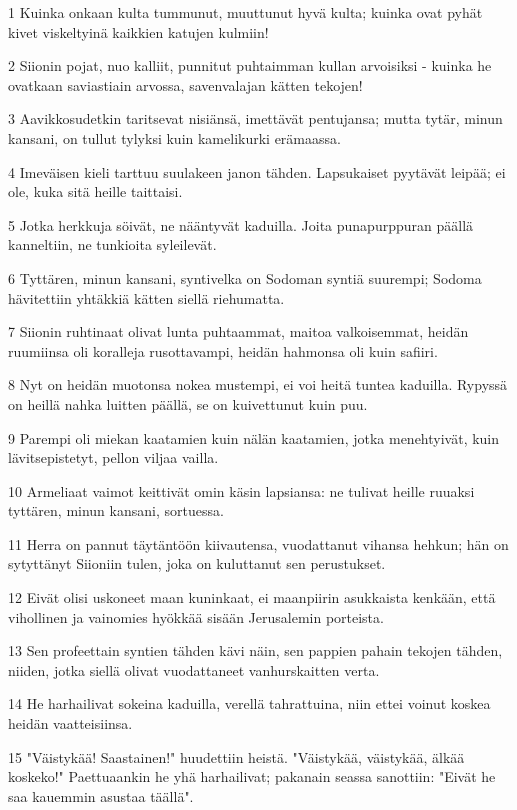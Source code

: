 \par 1 Kuinka onkaan kulta tummunut, muuttunut hyvä kulta; kuinka ovat pyhät kivet viskeltyinä kaikkien katujen kulmiin!
\par 2 Siionin pojat, nuo kalliit, punnitut puhtaimman kullan arvoisiksi - kuinka he ovatkaan saviastiain arvossa, savenvalajan kätten tekojen!
\par 3 Aavikkosudetkin taritsevat nisiänsä, imettävät pentujansa; mutta tytär, minun kansani, on tullut tylyksi kuin kamelikurki erämaassa.
\par 4 Imeväisen kieli tarttuu suulakeen janon tähden. Lapsukaiset pyytävät leipää; ei ole, kuka sitä heille taittaisi.
\par 5 Jotka herkkuja söivät, ne nääntyvät kaduilla. Joita punapurppuran päällä kanneltiin, ne tunkioita syleilevät.
\par 6 Tyttären, minun kansani, syntivelka on Sodoman syntiä suurempi; Sodoma hävitettiin yhtäkkiä kätten siellä riehumatta.
\par 7 Siionin ruhtinaat olivat lunta puhtaammat, maitoa valkoisemmat, heidän ruumiinsa oli koralleja rusottavampi, heidän hahmonsa oli kuin safiiri.
\par 8 Nyt on heidän muotonsa nokea mustempi, ei voi heitä tuntea kaduilla. Rypyssä on heillä nahka luitten päällä, se on kuivettunut kuin puu.
\par 9 Parempi oli miekan kaatamien kuin nälän kaatamien, jotka menehtyivät, kuin lävitsepistetyt, pellon viljaa vailla.
\par 10 Armeliaat vaimot keittivät omin käsin lapsiansa: ne tulivat heille ruuaksi tyttären, minun kansani, sortuessa.
\par 11 Herra on pannut täytäntöön kiivautensa, vuodattanut vihansa hehkun; hän on sytyttänyt Siioniin tulen, joka on kuluttanut sen perustukset.
\par 12 Eivät olisi uskoneet maan kuninkaat, ei maanpiirin asukkaista kenkään, että vihollinen ja vainomies hyökkää sisään Jerusalemin porteista.
\par 13 Sen profeettain syntien tähden kävi näin, sen pappien pahain tekojen tähden, niiden, jotka siellä olivat vuodattaneet vanhurskaitten verta.
\par 14 He harhailivat sokeina kaduilla, verellä tahrattuina, niin ettei voinut koskea heidän vaatteisiinsa.
\par 15 "Väistykää! Saastainen!" huudettiin heistä. "Väistykää, väistykää, älkää koskeko!" Paettuaankin he yhä harhailivat; pakanain seassa sanottiin: "Eivät he saa kauemmin asustaa täällä".

